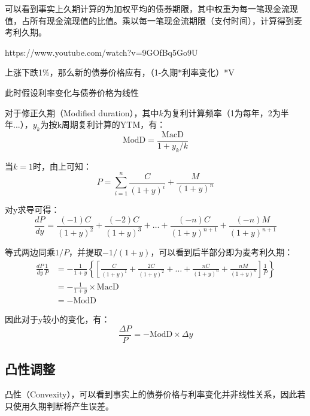 \documentclass[11pt]{article}
\begin{document}
可以看到事实上久期计算的为加权平均的债券期限，其中权重为每一笔现金流现值，占所有现金流现值的比值。乘以每一笔现金流期限（支付时间），计算得到麦考利久期。

\begin{example}

https://www.youtube.com/watch?v=9GOfBq5Go9U
    
上涨下跌1\%，那么新的债券价格应有，（1-久期*利率变化）*V

此时假设利率变化与债券价格为线性

\end{example}

对于修正久期（Modified duration），其中$k$为复利计算频率（1为每年，2为半年...），$y_k$为按k周期复利计算的YTM，有：
\begin{equation*}
    \text{ModD} = \frac{\text{MacD}}{1+y_k/k}
\end{equation*}

当$k=1$时，由上可知：
\begin{equation*}
    P = \sum_{i=1}^{n} \frac{C}{(1+y)^i} + \frac{M}{(1+y)^n}
\end{equation*}

对y求导可得：
\begin{equation*}
    \frac{dP}{dy} = \frac{(-1)C}{(1+y)^2} + \frac{(-2)C}{(1+y)^3} + \dots + \frac{(-n)C}{(1+y)^{n+1}} + \frac{(-n)M}{(1+y)^{n+1}}
\end{equation*}

等式两边同乘$1/P$，并提取$-1/(1+y)$，可以看到后半部分即为麦考利久期：
\begin{align*}
    \frac{dP}{dy} \frac{1}{P} &= -\frac{1}{1+y} \left\{ \left[ \frac{C}{(1+y)^1} + \frac{2C}{(1+y)^2} + \dots + \frac{nC}{(1+y)^{n}} + \frac{nM}{(1+y)^{n}} \right] \frac{1}{P} \right\} \\
    &= -\frac{1}{1+y} \times \text{MacD} \\
    &= - \text{ModD}
\end{align*}

因此对于y较小的变化，有：
\begin{equation*}
    \frac{\Delta P}{P} = - \text{ModD} \times \Delta y
\end{equation*}

\subsection{凸性调整}

凸性（Convexity），可以看到事实上的债券价格与利率变化并非线性关系，因此若只使用久期判断将产生误差。
\end{document}
